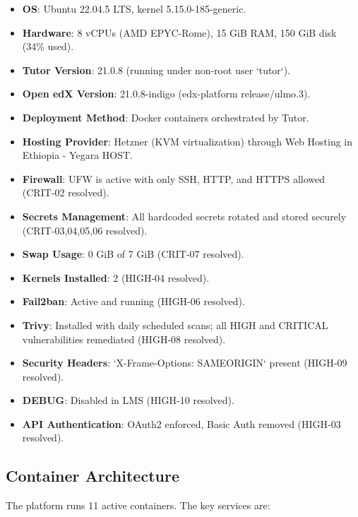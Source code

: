 \begin{itemize}
    \item \textbf{OS}: Ubuntu 22.04.5 LTS, kernel 5.15.0-185-generic.
    \item \textbf{Hardware}: 8 vCPUs (AMD EPYC-Rome), 15 GiB RAM, 150 GiB disk (34\% used).
    \item \textbf{Tutor Version}: 21.0.8 (running under non‑root user `tutor`).
    \item \textbf{Open edX Version}: 21.0.8-indigo (edx-platform release/ulmo.3).
    \item \textbf{Deployment Method}: Docker containers orchestrated by Tutor.
    \item \textbf{Hosting Provider}: Hetzner (KVM virtualization) through Web Hosting in Ethiopia - Yegara HOST.
    \item \textbf{Firewall}: UFW is active with only SSH, HTTP, and HTTPS allowed (CRIT‑02 resolved).
    \item \textbf{Secrets Management}: All hardcoded secrets rotated and stored securely (CRIT‑03,04,05,06 resolved).
    \item \textbf{Swap Usage}: 0 GiB of 7 GiB (CRIT‑07 resolved).
    \item \textbf{Kernels Installed}: 2 (HIGH‑04 resolved).
    \item \textbf{Fail2ban}: Active and running (HIGH‑06 resolved).
    \item \textbf{Trivy}: Installed with daily scheduled scans; all HIGH and CRITICAL vulnerabilities remediated (HIGH‑08 resolved).
    \item \textbf{Security Headers}: `X-Frame-Options: SAMEORIGIN` present (HIGH‑09 resolved).
    \item \textbf{DEBUG}: Disabled in LMS (HIGH‑10 resolved).
    \item \textbf{API Authentication}: OAuth2 enforced, Basic Auth removed (HIGH‑03 resolved).
\end{itemize}

\subsection{Container Architecture}
The platform runs 11 active containers. The key services are:

